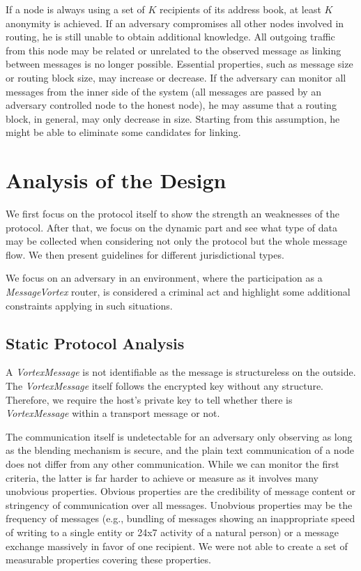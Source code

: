 \documentclass[acmsmall, screen]{acmart}
\begin{document}
If a node is always using a set of $K$ recipients of its address book, at least $K$ anonymity is achieved. If an adversary compromises all other nodes involved in routing, he is still unable to obtain additional knowledge. All outgoing traffic from this node may be related or unrelated to the observed message as linking between messages is no longer possible. Essential properties, such as message size or routing block size, may increase or decrease. If the adversary can monitor all messages from the inner side of the system (all messages are passed by an adversary controlled node to the honest node), he may assume that a routing block, in general, may only decrease in size. Starting from this assumption, he might be able to eliminate some candidates for linking.

\section{Analysis of the Design\label{sec:discussion}}
We first focus on the protocol itself to show the strength an weaknesses of the protocol. After that, we focus on the dynamic part and see what type of data may be collected when considering not only the protocol but the whole message flow. We then present guidelines for different jurisdictional types.

We focus on an adversary in an environment, where the participation as a \emph{MessageVortex} router, is considered a criminal act and highlight some additional constraints applying in such situations.

\subsection{Static Protocol Analysis\label{sec:staticAnalysis}}
A \emph{VortexMessage} is not identifiable as the message is structureless on the outside. The \emph{VortexMessage} itself follows the encrypted key without any structure. Therefore, we require the host's private key to tell whether there is \emph{VortexMessage} within a transport message or not.

The communication itself is undetectable for an adversary only observing as long as the blending mechanism is secure, and the plain text communication of a node does not differ from any other communication. While we can monitor the first criteria, the latter is far harder to achieve or measure as it involves many unobvious properties. Obvious properties are the credibility of message content or stringency of communication over all messages. Unobvious properties may be the frequency of messages (e.g., bundling of messages showing an inappropriate speed of writing to a single entity or 24x7 activity of a natural person) or a message exchange massively in favor of one recipient. We were not able to create a set of measurable properties covering these properties.
\end{document}
